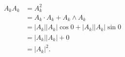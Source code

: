 \begin{note}
    \begin{align*}
        A_kA_k&=A_k^2 \\
              &=A_k \cdot A_k + A_k \wedge  A_k \\
              &=|A_k| |A_k| \cos 0 + |A_k| |A_k| \sin 0 \\
              &=|A_k| |A_k| + 0 \\
              &=|A_k|^2
    .\end{align*}
\end{note}

\newpage
